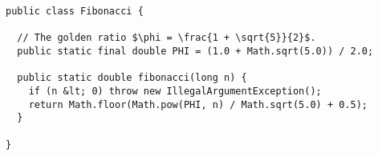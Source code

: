 \documentclass{article}
\begin{document}
\begin{verbatim}
public class Fibonacci {

  // The golden ratio $\phi = \frac{1 + \sqrt{5}}{2}$.
  public static final double PHI = (1.0 + Math.sqrt(5.0)) / 2.0;

  public static double fibonacci(long n) {
    if (n &lt; 0) throw new IllegalArgumentException();
    return Math.floor(Math.pow(PHI, n) / Math.sqrt(5.0) + 0.5);
  }

}
\end{verbatim}
\end{document}
